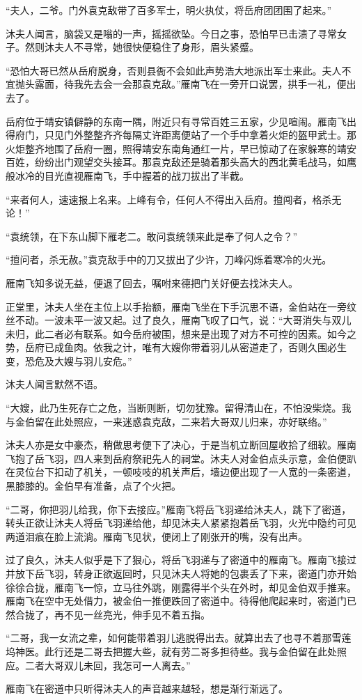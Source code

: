 “夫人，二爷。门外袁克敌带了百多军士，明火执仗，将岳府团团围了起来。”

沐夫人闻言，脑袋又是嗡的一声，摇摇欲坠。今日之事，恐怕早已击溃了寻常女子。然则沐夫人不寻常，她很快便稳住了身形，眉头紧蹙。

“恐怕大哥已然从岳府脱身，否则县衙不会如此声势浩大地派出军士来此。夫人不宜抛头露面，待我先去会一会那袁克敌。”雁南飞在一旁开口说罢，拱手一礼，便出去了。

岳府位于靖安镇僻静的东南一隅，附近只有寻常百姓三五家，少见喧闹。雁南飞出得府门，只见门外整整齐齐每隔丈许距离便站了一个手中拿着火炬的盔甲武士。那火炬整齐地围了岳府一圈，照得靖安东南角通红一片，早已惊动了在家躲寒的靖安百姓，纷纷出门观望交头接耳。那袁克敌还是骑着那头高大的西北黄毛战马，如鹰般冰冷的目光直视雁南飞，手中握着的战刀拔出了半截。

“来者何人，速速报上名来。上峰有令，任何人不得出入岳府。擅闯者，格杀无论！”

“袁统领，在下东山脚下雁老二。敢问袁统领来此是奉了何人之令？”

“擅问者，杀无赦。”袁克敌手中的刀又拔出了少许，刀峰闪烁着寒冷的火光。

雁南飞知多说无益，便退了回去，嘱咐来德把门关好便去找沐夫人。

正堂里，沐夫人坐在主位上以手抬额，雁南飞坐在下手沉思不语，金伯站在一旁纹丝不动。一波未平一波又起。过了良久，雁南飞叹了口气，说：“大哥消失与双儿未归，此二者必有联系。如今岳府被围，想来是出现了对方不可控的因素。如今之势，岳府已成鱼肉。依我之计，唯有大嫂你带着羽儿从密道走了，否则久围必生变，恐危及大嫂与羽儿安危。”

沐夫人闻言默然不语。

“大嫂，此乃生死存亡之危，当断则断，切勿犹豫。留得清山在，不怕没柴烧。我与金伯留在此处照应，一来迷惑袁克敌，二来若大哥双儿归来，亦好联络。”

沐夫人亦是女中豪杰，稍做思考便下了决心，于是当机立断回屋收拾了细软。雁南飞抱了岳飞羽，四人来到岳府祭祀先人的祠堂。沐夫人对金伯点头示意，金伯便趴在灵位台下扣动了机关，一顿吱吱的机关声后，墙边便出现了一人宽的一条密道，黑膝膝的。金伯早有准备，点了个火把。

“二哥，你把羽儿给我，你下去接应。”雁南飞将岳飞羽递给沐夫人，跳下了密道，转头正欲让沐夫人将岳飞羽递给他，却见沐夫人紧紧抱着岳飞羽，火光中隐约可见两道泪痕在脸上流淌。雁南飞见状，便闭上了刚张开的嘴，没有出声。

过了良久，沐夫人似乎是下了狠心，将岳飞羽递与了密道中的雁南飞。雁南飞接过并放下岳飞羽，转身正欲返回时，只见沐夫人将她的包裹丢了下来，密道门亦开始徐徐合拢，雁南飞一惊，立马往外跳，刚露得半个头在外时，却见金伯双手推来。雁南飞在空中无处借力，被金伯一推便跌回了密道中。待得他爬起来时，密道门已然合拢了，再不见一丝亮光，伸手见不着五指。

“二哥，我一女流之辈，如何能带着羽儿逃脱得出去。就算出去了也寻不着那雪莲坞神医。此行还是二哥去把握大些，就有劳二哥多担待些。我与金伯留在此处照应。二者大哥双儿未回，我怎可一人离去。”

雁南飞在密道中只听得沐夫人的声音越来越轻，想是渐行渐远了。